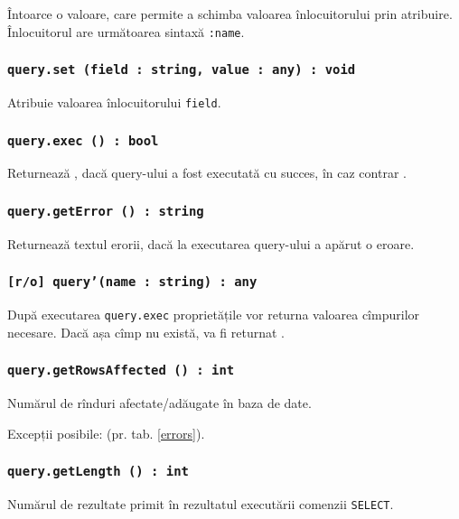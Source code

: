 Întoarce o valoare, care permite a schimba valoarea înlocuitorului prin atribuire. Înlocuitorul are următoarea sintaxă \texttt{:name}.

\subsubsection{\texttt{query.set (field : string, value : any) : void}}

Atribuie valoarea înlocuitorului \texttt{field}.

\subsubsection{\texttt{query.exec () : bool}}

Returnează \true, dacă query-ului a fost executată cu succes, în caz contrar \false.

\subsubsection{\texttt{query.getError () : string}}

Returnează textul erorii, dacă la executarea query-ului a apărut o eroare.

\subsubsection{\texttt{[r/o] query'(name : string) : any}}

După executarea \texttt{query.exec} proprietățile vor returna valoarea cîmpurilor necesare. Dacă așa cîmp nu există, va fi returnat \void.

\subsubsection{\texttt{query.getRowsAffected () : int}}

Numărul de rînduri afectate/adăugate în baza de date.

Excepții posibile:  (pr. tab. \ref{errors}).

\subsubsection{\texttt{query.getLength () : int}}

Numărul de rezultate primit în rezultatul executării comenzii \texttt{SELECT}.

